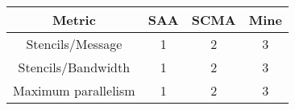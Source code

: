 \begin{tabular}{@{}cccc@{}} \toprule
Metric & SAA & SCMA & Mine \\
\midrule
  Stencils/Message & 1 & 2 & 3 \\
  Stencils/Bandwidth & 1 & 2 & 3 \\
  Maximum parallelism & 1 & 2 & 3 \\
\bottomrule
\end{tabular}
